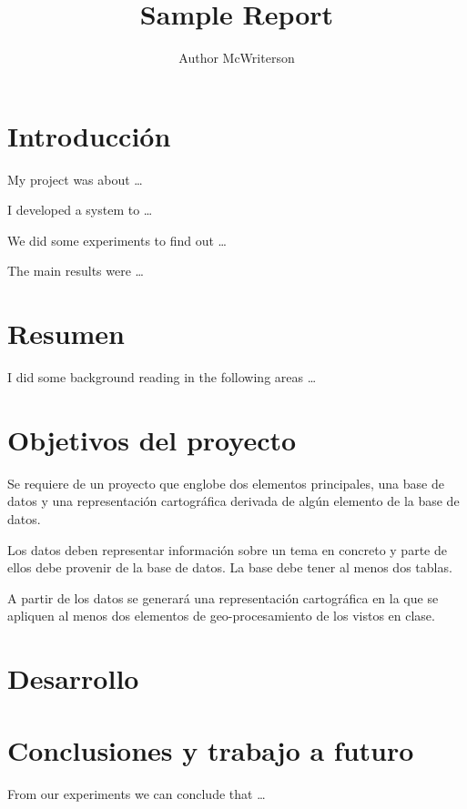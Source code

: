 \documentclass[a4paper, 11pt]{article}
\title{Sample Report}
\author{Author McWriterson}
\begin{document}
\maketitle
\tableofcontents

\section{Introducción}

My project was about \ldots

I developed a system to \ldots

We did some experiments to find out \ldots

The main results were \ldots

\pagebreak

\section{Resumen}

I did some background reading in the following areas \ldots


\pagebreak

\section{Objetivos del proyecto}

Se requiere de un proyecto que englobe dos elementos principales, una base de
datos y una representación cartográfica derivada de algún elemento de la base de
datos.

Los datos deben representar información sobre un tema en concreto y parte de
ellos debe provenir de la base de datos. La base debe tener al menos dos tablas.

A partir de los datos se generará una representación cartográfica en la que se
apliquen al menos dos elementos de geo-procesamiento de los vistos en clase.

\pagebreak

\section{Desarrollo}

\section{Conclusiones y trabajo a futuro}

From our experiments we can conclude that \ldots

% 
\end{document}
